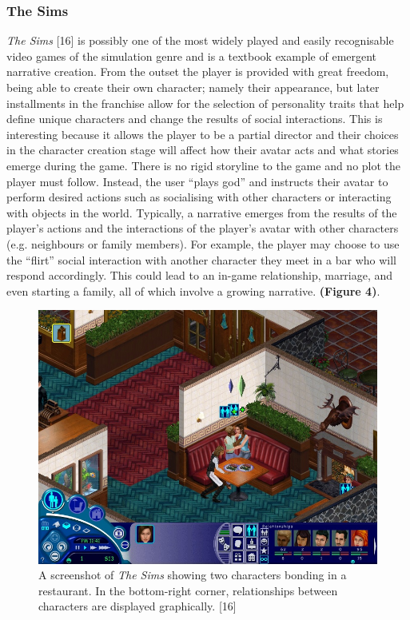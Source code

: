 \documentclass{sig-alternate-05-2015}
\begin{document}
\subsubsection{The Sims}
\textit{The Sims} [16] is possibly one of the most widely played and easily recognisable video games of the simulation genre and is a textbook example of emergent narrative creation. 
From the outset the player is provided with great freedom, being able to create their own character; namely their appearance, but later installments in the franchise allow for the selection of personality traits that help define unique characters and change the results of social interactions. This is interesting because it allows the player to be a partial director and their choices in the character creation stage will affect how their avatar acts and what stories emerge during the game. There is no rigid storyline to the game and no plot the player must follow. Instead, the user ``plays god'' and instructs their avatar to perform desired actions such as socialising with other characters or interacting with objects in the world. Typically, a narrative emerges from the results of the player's actions and the interactions of the player's avatar with other characters (e.g. neighbours or family members). For example, the player may choose to use the ``flirt'' social interaction with another character they meet in a bar who will respond accordingly. This could lead to an in-game relationship, marriage, and even starting a family, all of which involve a growing narrative. \textbf{(Figure 4)}.\\

\begin{figure}
\centering
\includegraphics[scale=0.37]{Images/sims.png}
\caption{A screenshot of \textit{The Sims} showing two characters bonding in a restaurant. In the bottom-right corner, relationships between characters are displayed graphically. [16]}
\end{figure}
\end{document}
